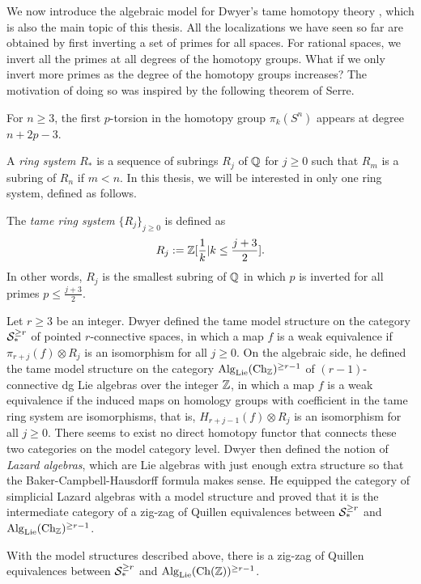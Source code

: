 We now introduce the algebraic model for Dwyer's tame homotopy theory \cite{Dwyer}, which is also the main topic of this thesis.
All the localizations we have seen so far are obtained by first inverting a set of primes for all spaces. For rational spaces, we invert all the primes at all degrees of the homotopy groups.
What if we only invert more primes as the degree of the homotopy groups increases?
The motivation of doing so was inspired by the following theorem of Serre.
\begin{theorem}[Serre]
	For $n\geq 3$, the first $p$-torsion in the homotopy group $\pi_{k}(S^{n})$ appears at degree $ n+2p-3$.
\end{theorem}

A \emph{ring system} $R_*$ is a sequence of subrings $R_j$ of ${\mathbb{Q}}$ for $j\geq 0$ such that  $R_m$ is a subring of $R_n$ if $m<n$. In this thesis, we will be interested in only one ring system, defined as follows.
\begin{definition}
\label{tame ring system}
The \emph{tame ring system} $\{R_j\}_{j\geq 0}$ is defined as 
$$
R_{j}:={\mathbb{Z}}[\frac{1}{k}|k\leq \frac{j+3}{2}].
$$
In other words, $R_j$ is the smallest subring of ${\mathbb{Q}}$ in which $p$ is inverted for all primes $p \leq \frac{j+3}{2}$.
\end{definition}

Let $r\geq 3$ be an integer. 
Dwyer \cite{Dwyer} defined the tame model structure on the category ${\mathcal{S}}^{\geq r}_*$ of pointed $r$-connective spaces, in which a map $f$ is a weak equivalence if $\pi_{r+j}(f)\otimes R_j$ is an isomorphism for all $j\geq 0$.
On the algebraic side, he defined the tame model structure on the category $\operatorname{Alg}_{\operatorname{Lie}}(\operatorname{Ch}_{\mathbb{Z}})^{\geq r-1}$ of $(r-1)$-connective dg Lie algebras over the integer ${\mathbb{Z}}$, in which a map $f$ is a weak equivalence if the induced maps on homology groups with coefficient in the tame ring system are isomorphisms, that is, $H_{r+j-1}(f)\otimes R_j$ is an isomorphism for all $j\geq 0$.
There seems to exist no direct homotopy functor that connects these two categories on the model category level.
Dwyer then defined the notion of \emph{Lazard algebras}, which are Lie algebras with just enough extra structure so that the Baker-Campbell-Hausdorff formula makes sense. He equipped the category of simplicial Lazard algebras with a model structure and proved that it is the intermediate category of a zig-zag of Quillen equivalences between ${\mathcal{S}}^{\geq r}_*$ and $\operatorname{Alg}_{\operatorname{Lie}}(\operatorname{Ch}_{\mathbb{Z}})^{\geq r-1}$.
\begin{theorem}
\cite{Dwyer}
With the model structures described above,
there is a zig-zag of Quillen equivalences between ${\mathcal{S}}^{\geq r}_*$ and $\operatorname{Alg}_{\operatorname{Lie}}(\operatorname{Ch}({\mathbb{Z}}))^{\geq r-1}$.
\end{theorem}

